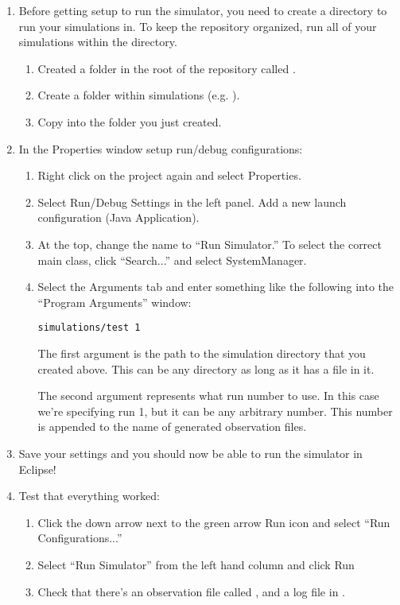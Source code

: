 \documentclass[11pt]{article}
\begin{document}
\begin{enumerate}
\item Before getting setup to run the simulator, you need to create a directory
  to run your simulations in.  To keep the repository organized, run all of your
  simulations within the  directory.
  \begin{enumerate}
  \item Created a folder in the root of the repository called .
  \item Create a folder within simulations (e.g. ).
  \item Copy  into the folder you just created.
  \end{enumerate}

\item In the Properties window setup run/debug configurations:
  \begin{enumerate}
  \item Right click on the project again and select Properties.
  \item Select Run/Debug Settings in the left panel. Add a new launch
    configuration (Java Application).
  \item At the top, change the name to ``Run Simulator.'' To select the
    correct main class, click ``Search...'' and select SystemManager.
  \item Select the Arguments tab and enter something like the following into the
    ``Program Arguments'' window:

\begin{verbatim}
simulations/test 1
\end{verbatim}

The first argument is the path to the simulation directory that you created
above.  This can be any directory as long as it has a
 file in it.

The second argument represents what run number to use. In this case we're
specifying run 1, but it can be any arbitrary number. This number is appended
to the name of generated observation files.
  \end{enumerate}
  
\item Save your settings and you should now be able to run the simulator in
Eclipse!

\item Test that everything worked:
  \begin{enumerate}
  \item Click the down arrow next to the green arrow Run icon and select ``Run
    Configurations...''
  \item Select ``Run Simulator'' from the left hand column and click Run
  \item Check that there's an observation file called
    , and a log file in
    .
  \end{enumerate}

\end{enumerate}
\end{document}
